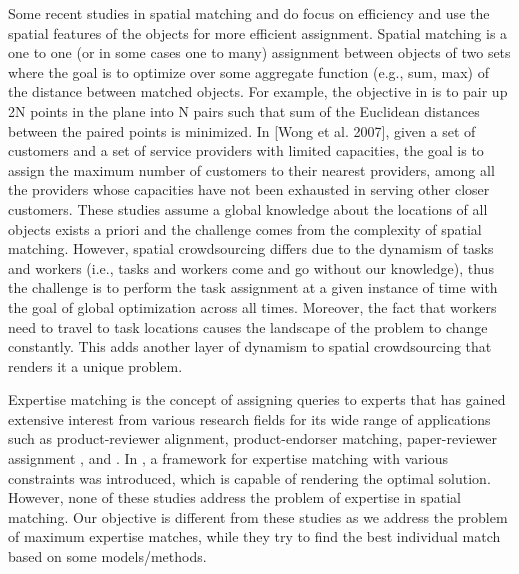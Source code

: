 \documentclass{USC-Thesis}
\numberwithin{equation}{chapter}
\begin{document}
Some recent studies in spatial matching \cite{wong2007efficient} and \cite{yiu2008capacity} do focus on efficiency and use the spatial features of the objects for more efficient assignment. Spatial matching is a one to one (or in some cases one to many) assignment between objects of two sets where the goal is to optimize over some aggregate function (e.g., sum, max) of the distance between matched objects. For example, the objective in \cite{varadarajan1998divide} is to pair up 2N points in the plane into N pairs such that sum of the Euclidean distances between the paired points is minimized. In [Wong et al. 2007], given a set of customers and a set of service providers with limited capacities, the goal is to assign the maximum number of customers to their nearest providers, among all the providers whose capacities have not been exhausted in serving other closer customers. These studies assume a global knowledge about the locations of all objects exists a priori and the challenge comes from the complexity of spatial matching. However, spatial crowdsourcing differs due to the dynamism of tasks and workers (i.e., tasks and workers come and go without our knowledge), thus the challenge is to perform the task assignment at a given instance of time with the goal of global optimization across all times. Moreover, the fact that workers need to travel to task locations causes the landscape of the problem to change constantly. This adds another layer of dynamism to spatial crowdsourcing that renders it a unique problem.

Expertise matching is the concept of assigning queries to experts that has gained extensive interest from various research fields for its wide range of applications such as product-reviewer alignment, product-endorser matching, paper-reviewer assignment \cite{mimno2007expertise}, \cite{sun2008hybrid} and \cite{hettich2006mining}. In \cite{tang2012optimization}, a framework for expertise matching with various constraints was introduced, which is capable of rendering the optimal solution. However, none of these studies address the problem of expertise in spatial matching. Our objective is different from these studies as we address the problem of maximum expertise matches, while they try to find the best individual match based on some models/methods.
\end{document}
